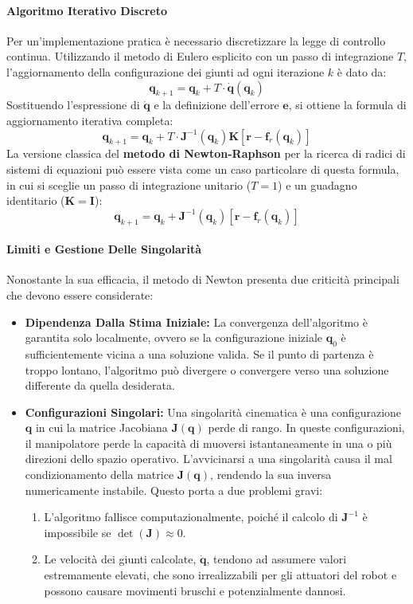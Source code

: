 \documentclass[11pt, a4paper]{report}
\begin{document}
\paragraph{Algoritmo Iterativo Discreto}
Per un'implementazione pratica è necessario discretizzare la legge di controllo continua. Utilizzando il metodo di Eulero esplicito con un passo di integrazione \(T\), l'aggiornamento della configurazione dei giunti ad ogni iterazione \(k\) è dato da:
\[
    \bm{q}_{k+1} = \bm{q}_k + T \cdot \dot{\bm{q}}(\bm{q}_k)
\]
Sostituendo l'espressione di \(\dot{\bm{q}}\) e la definizione dell'errore \(\bm{e}\), si ottiene la formula di aggiornamento iterativa completa:
\[
    \bm{q}_{k+1} = \bm{q}_k + T \cdot \bm{J}^{-1}(\bm{q}_k) \bm{K} \left[ \bm{r} - \bm{f}_r(\bm{q}_k) \right]
\]
La versione classica del \textbf{metodo di Newton-Raphson} per la ricerca di radici di sistemi di equazioni può essere vista come un caso particolare di questa formula, in cui si sceglie un passo di integrazione unitario (\(T=1\)) e un guadagno identitario (\(\bm{K}=\bm{I}\)):
\[
    \bm{q}_{k+1} = \bm{q}_k + \bm{J}^{-1}(\bm{q}_k) \left[ \bm{r} - \bm{f}_r(\bm{q}_k) \right]
\]

\paragraph{Limiti e Gestione Delle Singolarità}
Nonostante la sua efficacia, il metodo di Newton presenta due criticità principali che devono essere considerate:
\begin{itemize}
    \item \textbf{Dipendenza Dalla Stima Iniziale:} La convergenza dell'algoritmo è garantita solo localmente, ovvero se la configurazione iniziale \(\bm{q}_0\) è sufficientemente vicina a una soluzione valida. Se il punto di partenza è troppo lontano, l'algoritmo può divergere o convergere verso una soluzione differente da quella desiderata.
    \item \textbf{Configurazioni Singolari:} Una singolarità cinematica è una configurazione \(\bm{q}\) in cui la matrice Jacobiana \(\bm{J}(\bm{q})\) perde di rango. In queste configurazioni, il manipolatore perde la capacità di muoversi istantaneamente in una o più direzioni dello spazio operativo. L'avvicinarsi a una singolarità causa il mal condizionamento della matrice \(\bm{J}(\bm{q})\), rendendo la sua inversa numericamente instabile. Questo porta a due problemi gravi:
    \begin{enumerate}
        \item L'algoritmo fallisce computazionalmente, poiché il calcolo di \(\bm{J}^{-1}\) è impossibile se \(\det(\bm{J}) \approx 0\).
        \item Le velocità dei giunti calcolate, \(\dot{\bm{q}}\), tendono ad assumere valori estremamente elevati, che sono irrealizzabili per gli attuatori del robot e possono causare movimenti bruschi e potenzialmente dannosi.
    \end{enumerate}
\end{itemize}
\end{document}
